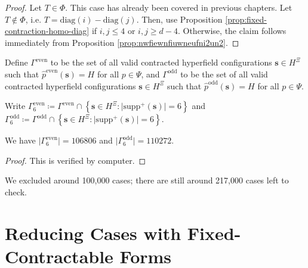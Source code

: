 \begin{proof}
    Let \( T \in \Phi \). This case has already been covered in previous chapters. Let \( T \notin \Phi \), i.e. \( T = \mathrm{diag}(i) - \mathrm{diag}(j) \). Then, use Proposition \ref{prop:fixed-contraction-homo-diag} if \( i,j \leq 4 \) or \( i,j \geq d-4 \). Otherwise, the claim follows immediately from Proposition \ref{prop:nwfiewnfiuwneufni2un2}.
\end{proof}


\begin{definition}
 Define \( \Gamma^{\mathrm{even}} \) to be the set of all valid contracted hyperfield configurations \( \mathbf{s} \in H^{\Xi} \) such that \( \hat p^{\mathrm{even}}(\mathbf{s}) = H \) for all \( p \in \Psi \), and \( \Gamma^{\mathrm{odd}} \) to be the set of all valid contracted hyperfield configurations \( \mathbf{s} \in H^{\Xi} \) such that \( \hat p^{\mathrm{odd}}(\mathbf{s}) = H \) for all \( p \in \Psi \). 

\end{definition}

\begin{definition}
    Write \( \Gamma^{\mathrm{even}}_6 \coloneqq \Gamma^{\mathrm{even}} \cap \left\{ \mathbf{s} \in H^{\Xi} : \lvert \mathrm{supp}^+(\mathbf{s}) \rvert = 6 \right\} \) and \( \Gamma^{\mathrm{odd}}_6 \coloneqq \Gamma^{\mathrm{odd}} \cap \left\{ \mathbf{s} \in H^{\Xi} : \lvert \mathrm{supp}^+(\mathbf{s}) \rvert = 6 \right\} \).

\end{definition}

\begin{proposition}
    We have \( \lvert \Gamma^{\mathrm{even}}_6 \rvert  = 106806\) and \( \lvert \Gamma^{\mathrm{odd}}_6 \rvert  = 110272\).
\end{proposition}

\begin{proof}
    This is verified by computer.
\end{proof}

We excluded around 100,000 cases; there are still around 217,000 cases left to check.

\section{Reducing Cases with Fixed-Contractable Forms}

